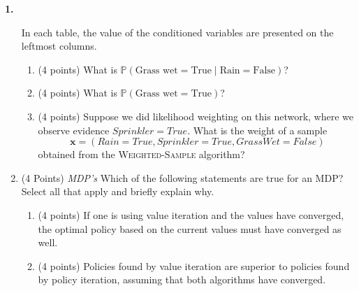 \documentclass[12pt]{amsart}
\newenvironment{statement}[1]{\smallskip\noindent\color[rgb]{0.0,0.0,0.0} {\bf #1.}}{}
\theoremstyle{definition}
\theoremstyle{remark}
\newcommand{\1}{\mathds{1}}
\begin{document}
\begin{statement}{1}
\begin{enumerate}
\begin{center}
\begin{tikzpicture}[
  node distance=1cm and 0cm,
  mynode/.style={draw,ellipse,text width=2cm,align=center}
]
\end{tikzpicture}
\end{center}
    In each table, the value of the conditioned variables are presented on the leftmost columns.
    \begin{enumerate}
        \item (4 points) What is $\mathbb{P}(\text{Grass wet}=\text{True}\mid \text{Rain}=\text{False})$?
        \item (4 points) What is $\mathbb{P}(\text{Grass wet}=\text{True})$?
        \item (4 points) Suppose we did likelihood weighting on this network, where we observe evidence $Sprinkler=True$.
        What is the weight of a sample \[\bm x = (Rain=True, Sprinkler=True, GrassWet=False)\] obtained from the \textsc{Weighted-Sample} algorithm?
    \end{enumerate}
    

\item (4 Points) \textit{MDP's} Which of the following statements are true for an MDP? Select all that apply and briefly explain why.
    \begin{enumerate}
        \item (4 points) If one is using value iteration and the values have converged, the optimal policy based on the current values must have converged as well.
        \item (4 points) Policies found by value iteration are superior to policies found by policy iteration, assuming that both algorithms have converged.
    \end{enumerate}
\end{enumerate}
\end{statement}
\end{document}
